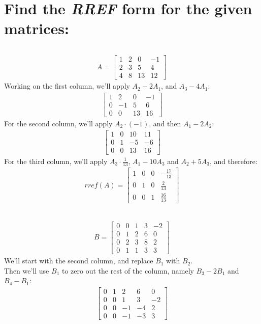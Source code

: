 \documentclass[a4paper, 12pt]{article}
\newcommand{\sub}[1]{\subsection{\underline{#1}}}
\newcommand{\?}{\stackrel{?}{=}}
\newcommand{\eq}[1]{\begin{align*}#1\end{align*}}
\begin{document}
\begin{titlepage}
    
\end{titlepage}

\setcounter{section}{3}
\section{Find the \textit{RREF} form for the given matrices:}
\sub{}
\eq{
    A=\begin{bmatrix}
        1&2&0&-1\\
        2&3&5&4\\
        4&8&13&12
    \end{bmatrix}
}
Working on the first column, we'll apply $A_2-2A_1$, and $A_3-4A_1$:
\eq{
    \begin{bmatrix}
        1&2&0&-1\\
        0&-1&5&6\\
        0&0&13&16
    \end{bmatrix}
}
For the second column, we'll apply $A_2\cdot(-1)$, and then $A_1-2A_2$:
\eq{
    \begin{bmatrix}
        1&0&10&11\\
        0&1&-5&-6\\
        0&0&13&16
    \end{bmatrix}
}
For the third column, we'll apply $A_3\cdot\frac{1}{13}$, $A_1-10A_3$ and $A_2+5A_3$, and therefore:
\eq{
    rref(A)=\begin{bmatrix}
        1&0&0&-\frac{17}{13}\\
        0&1&0&\frac{2}{13}\\
        0&0&1&\frac{16}{13}
    \end{bmatrix}
}
\sub{}
\eq{
    B=\begin{bmatrix}
        0&0&1&3&-2\\
        0&1&2&6&0\\
        0&2&3&8&2\\
        0&1&1&3&3
    \end{bmatrix}
}
We'll start with the second column, and replace $B_1$ with $B_2$.\\
Then we'll use $B_1$ to zero out the rest of the column, namely $B_3-2B_1$ and $B_4-B_1$:
\eq{\begin{bmatrix}
    0&1&2&6&0\\
    0&0&1&3&-2\\
    0&0&-1&-4&2\\
    0&0&-1&-3&3
\end{bmatrix}}
\end{document}
